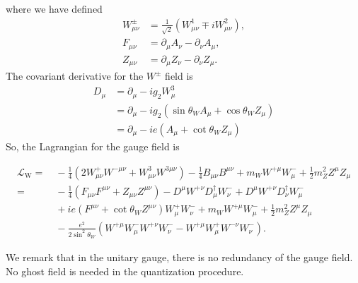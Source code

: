 \documentclass[aps,rmp,twocolumn,superscriptaddress,nofootinbib]{revtex4-2}
\begin{document}
where we have defined 
\begin{equation*}
\begin{aligned}
	W^\pm_{\mu\nu} &= \frac{1}{\sqrt 2} (W^1_{\mu\nu} \mp i W^2_{\mu\nu}), \\
	F_{\mu\nu} &= \partial_\mu A_\nu - \partial_\nu A_\mu, \\
	Z_{\mu\nu} &= \partial_\mu Z_\nu - \partial_\nu Z_\mu.
\end{aligned}
\end{equation*}
The covariant derivative for the $W^\pm$ field is
\begin{equation*}
\begin{aligned}
	D_\mu &= \partial_\mu -i g_2 W^3_\mu \\
	&= \partial_\mu -i g_2 \left(\sin{\theta_W}A_\mu + \cos{\theta_W} Z_\mu \right) \\
	&= \partial_\mu -i e \left(A_\mu + \cot{\theta_W} Z_\mu \right)
\end{aligned}
\end{equation*}
So, the Lagrangian for the gauge field is
\begin{widetext}
\begin{equation}
\begin{aligned}
	\mathcal L_\mathrm{W}
	=&\ -\frac{1}{4}(2W_{\mu\nu}^+ W^{-\mu\nu} + W_{\mu\nu}^3 W^{3\mu\nu}) -\frac{1}{4} B_{\mu\nu}B^{\mu\nu} + m_W W^{+\mu} W_\mu^- + \frac{1}{2}m_Z^2 Z^\mu Z_\mu \\
	=&\ -\frac{1}{4}(F_{\mu\nu}F^{\mu\nu} + Z_{\mu\nu} Z^{\mu\nu}) - D^{\mu} W^{+\nu} D^\dagger_\mu W_\nu^- + D^\mu W^{+\nu} D^\dagger_\nu W^-_\mu \\
	&\ +ie (F^{\mu\nu} + \cot{\theta_W} Z^{\mu\nu})W_\mu^+ W_\nu^- + m_W W^{+\mu} W_\mu^- + \frac{1}{2}m_Z^2 Z^\mu Z_\mu \\
	&\ -\frac{e^2}{2\sin^2{\theta_W}} \left(W^{+\mu}W^-_\mu W^{+\nu}W^-_\nu - W^{+\mu}W^+_\mu W^{-\nu}W^-_\nu \right).
\end{aligned}
\end{equation}
\end{widetext}
We remark that in the unitary gauge, there is no redundancy of the gauge field.
No ghost field is needed in the quantization procedure.
\end{document}
